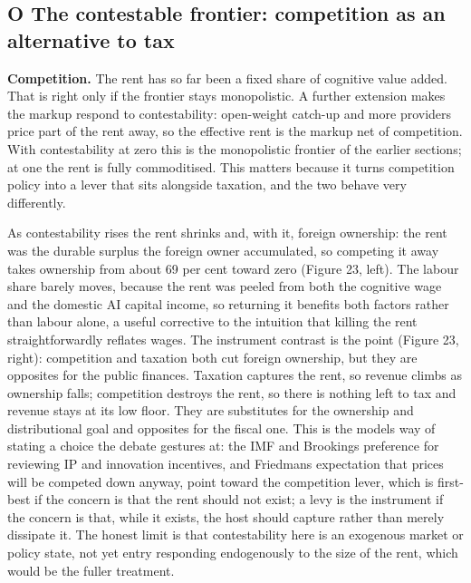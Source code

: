 \documentclass[12pt]{article}
\begin{document}
\hypertarget{o-the-contestable-frontier-competition-as-an-alternative-to-tax}{%
\subsection{O \textperiodcentered{} The contestable frontier: competition as an alternative
to
tax}\label{o-the-contestable-frontier-competition-as-an-alternative-to-tax}}

\textbf{Competition.} The rent has so far been a fixed share of
cognitive value added. That is right only if the frontier stays
monopolistic. A further extension makes the markup respond to
contestability: open-weight catch-up and more providers price part of
the rent away, so the effective rent is the markup net of competition.
With contestability at zero this is the monopolistic frontier of the
earlier sections; at one the rent is fully commoditised. This matters
because it turns competition policy into a lever that sits alongside
taxation, and the two behave very differently.

As contestability rises the rent shrinks and, with it, foreign
ownership: the rent was the durable surplus the foreign owner
accumulated, so competing it away takes ownership from about 69 per cent
toward zero (Figure 23, left). The labour share barely moves, because
the rent was peeled from both the cognitive wage and the domestic AI
capital income, so returning it benefits both factors rather than labour
alone, a useful corrective to the intuition that killing the rent
straightforwardly reflates wages. The instrument contrast is the point
(Figure 23, right): competition and taxation both cut foreign ownership,
but they are opposites for the public finances. Taxation captures the
rent, so revenue climbs as ownership falls; competition destroys the
rent, so there is nothing left to tax and revenue stays at its low
floor. They are substitutes for the ownership and distributional goal
and opposites for the fiscal one. This is the model\textquotesingle s
way of stating a choice the debate gestures at: the IMF and Brookings
preference for reviewing IP and innovation incentives, and
Friedman\textquotesingle s expectation that prices will be competed down
anyway, point toward the competition lever, which is first-best if the
concern is that the rent should not exist; a levy is the instrument if
the concern is that, while it exists, the host should capture rather
than merely dissipate it. The honest limit is that contestability here
is an exogenous market or policy state, not yet entry responding
endogenously to the size of the rent, which would be the fuller
treatment.
\end{document}
